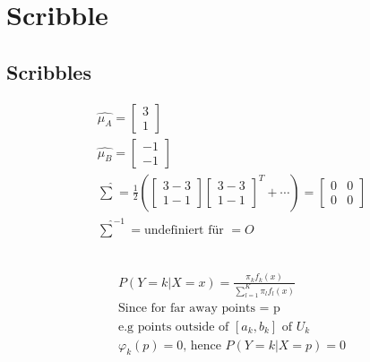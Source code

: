 \documentclass[../Main.tex]{subfiles}
\begin{document}
\chapter{Scribble}

\intro{

}

\section{Scribbles}
\begin{equation}
    \begin{split}
        \hat{\mu_A} = \begin{bmatrix}
                3 \\
                1
            \end{bmatrix} \\
        \hat{\mu_B} = \begin{bmatrix}
                -1 \\
                -1
            \end{bmatrix}\\
        \hat{\sum}= \frac{1}{2} (\begin{bmatrix}
                3-3 \\
                1-1
        \end{bmatrix}\begin{bmatrix}
            3-3 \\
            1-1
    \end{bmatrix}^T +\cdots)
        = \begin{bmatrix}
            0&0 \\
            0&0
    \end{bmatrix}\\
    \hat{\sum}^{-1} = \text{undefiniert für } = O
    \end{split}
\end{equation}\

\begin{equation}
    \begin{split}
        P(Y=k|X=x) = \frac{\pi_k f_k(x)}{\sum_{l=1}^{K} \pi_l f_l(x)} \\
        \text{Since for far away points = p}\\
        \text{e.g points outside of } [a_k,b_k] \text{ of } U_k\\
        \varphi_k(p)=0 \text{, hence } P(Y=k|X=p)=0\\
    \end{split}
\end{equation}
\end{document}
